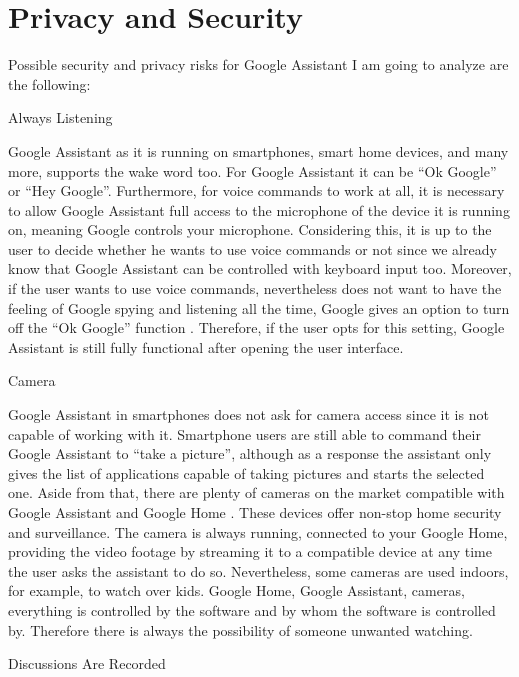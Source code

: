 \documentclass[
  digital, %
  oneside, %
  table,   %
  lof,     %
  lot,     %
]{fithesis3}
\begin{document}
\section{Privacy and Security}
Possible security and privacy risks for Google Assistant I am going to analyze are the following:
\begin{compactitem}
  \item Always Listening
  
Google Assistant as it is running on smartphones, smart home devices, and many more, supports the wake word too. For Google Assistant it can be ``Ok Google'' or ``Hey Google''. Furthermore, for voice commands to work at all, it is necessary to allow Google Assistant full access to the microphone of the device it is running on, meaning Google controls your microphone. Considering this, it is up to the user to decide whether he wants to use voice commands or not since we already know that Google Assistant can be controlled with keyboard input too. Moreover, if the user wants to use voice commands, nevertheless does not want to have the feeling of Google spying and listening all the time, Google gives an option to turn off the ``Ok Google'' function \parencite{google_turnoff}. Therefore, if the user opts for this setting, Google Assistant is still fully functional after opening the user interface.

  \item Camera
  
Google Assistant in smartphones does not ask for camera access since it is not capable of working with it. Smartphone users are still able to command their Google Assistant to ``take a picture'', although as a response the assistant only gives the list of applications capable of taking pictures and starts the selected one. Aside from that, there are plenty of cameras on the market compatible with Google Assistant and Google Home \parencite{google_camera}. These devices offer non-stop home security and surveillance. The camera is always running, connected to your Google Home, providing the video footage by streaming it to a compatible device at any time the user asks the assistant to do so. Nevertheless, some cameras are used indoors, for example, to watch over kids. Google Home, Google Assistant, cameras, everything is controlled by the software and by whom the software is controlled by. Therefore there is always the possibility of someone unwanted watching. 

  \item Discussions Are Recorded
  

\end{compactitem}
\end{document}
